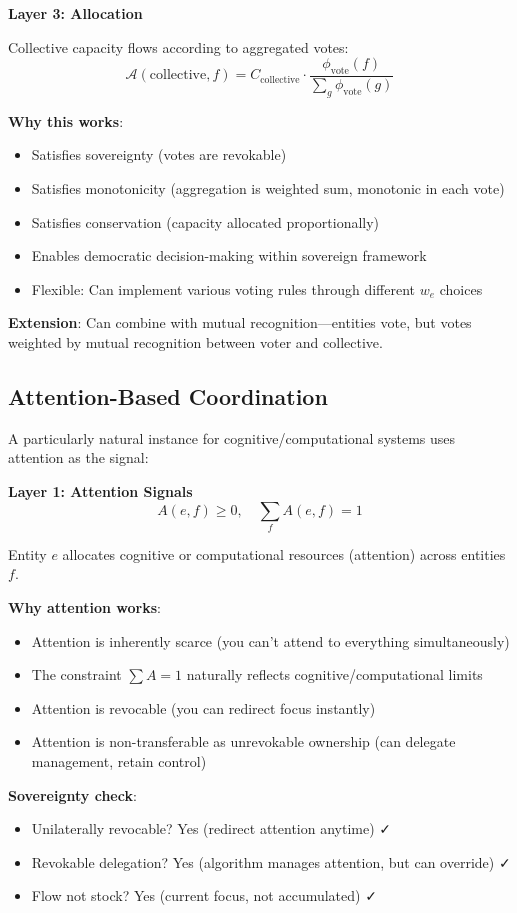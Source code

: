\documentclass[11pt,a4paper]{article}
\theoremstyle{definition}
\theoremstyle{remark}
\newcommand{\A}{\mathcal{A}}
\begin{document}
\textbf{Layer 3: Allocation}

Collective capacity flows according to aggregated votes:
\[ \A(\text{collective}, f) = C_{\text{collective}} \cdot \frac{\phi_{\text{vote}}(f)}{\sum_g \phi_{\text{vote}}(g)} \]

\textbf{Why this works}:
\begin{itemize}
\item Satisfies sovereignty (votes are revokable)
\item Satisfies monotonicity (aggregation is weighted sum, monotonic in each vote)
\item Satisfies conservation (capacity allocated proportionally)
\item Enables democratic decision-making within sovereign framework
\item Flexible: Can implement various voting rules through different $w_e$ choices
\end{itemize}

\textbf{Extension}: Can combine with mutual recognition—entities vote, but votes weighted by mutual recognition between voter and collective.

\subsection{Attention-Based Coordination}

A particularly natural instance for cognitive/computational systems uses attention as the signal:

\textbf{Layer 1: Attention Signals}
\[ A(e,f) \ge 0, \quad \sum_f A(e,f) = 1 \]

Entity $e$ allocates cognitive or computational resources (attention) across entities $f$.

\textbf{Why attention works}:
\begin{itemize}
\item Attention is inherently scarce (you can't attend to everything simultaneously)
\item The constraint $\sum A = 1$ naturally reflects cognitive/computational limits
\item Attention is revocable (you can redirect focus instantly)
\item Attention is non-transferable as unrevokable ownership (can delegate management, retain control)
\end{itemize}

\textbf{Sovereignty check}:
\begin{itemize}
\item Unilaterally revocable? Yes (redirect attention anytime) ✓
\item Revokable delegation? Yes (algorithm manages attention, but can override) ✓
\item Flow not stock? Yes (current focus, not accumulated) ✓
\end{itemize}
\end{document}
